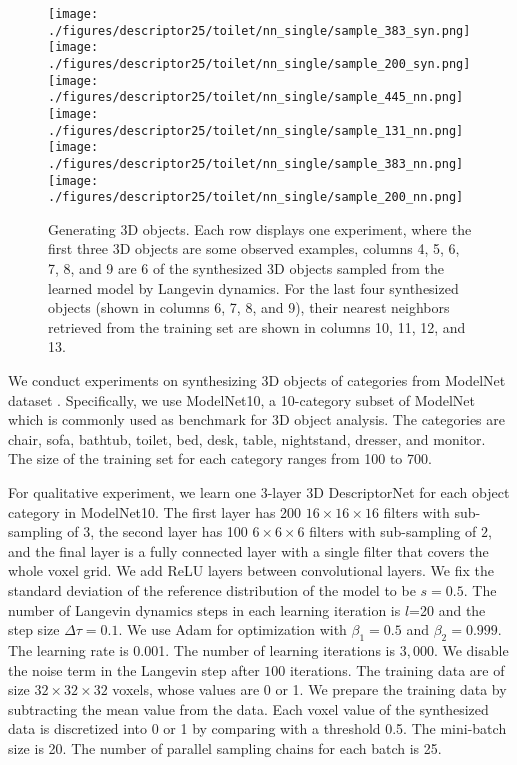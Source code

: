 \documentclass[10pt,twocolumn,letterpaper]{article}
\begin{document}
\begin{figure*}[h]
     \texttt{[image: ./figures/descriptor25/toilet/nn\_single/sample\_383\_syn.png]}          \hspace{-2.5mm}   
     \texttt{[image: ./figures/descriptor25/toilet/nn\_single/sample\_200\_syn.png]}        \hspace{-2.5mm}        
     \texttt{[image: ./figures/descriptor25/toilet/nn\_single/sample\_445\_nn.png]}          \hspace{-3mm}   
     \texttt{[image: ./figures/descriptor25/toilet/nn\_single/sample\_131\_nn.png]}          \hspace{-3mm}   
     \texttt{[image: ./figures/descriptor25/toilet/nn\_single/sample\_383\_nn.png]}          \hspace{-2.5mm}  
     \texttt{[image: ./figures/descriptor25/toilet/nn\_single/sample\_200\_nn.png]}          \\
	\caption{Generating 3D objects. Each row displays one experiment, where the first three 3D objects are some observed examples, columns 4, 5, 6, 7, 8, and 9 are 6 of the synthesized 3D objects sampled from the learned model by Langevin dynamics. For the last four synthesized objects (shown in columns 6, 7, 8, and 9), their nearest neighbors retrieved from the training set are shown in columns 10, 11, 12, and 13. }	
	\label{exp:synthesis}
\end{figure*}


We conduct experiments on synthesizing 3D objects of categories from ModelNet dataset \cite{wu20153d}. Specifically, we use ModelNet10, a 10-category subset of ModelNet which is commonly used as benchmark for 3D object analysis. The categories are chair, sofa, bathtub, toilet, bed, desk, table, nightstand, dresser, and monitor. The size of the training set for each category ranges from 100 to 700.

For qualitative experiment, we learn one 3-layer 3D DescriptorNet for each object category in ModelNet10. The first layer has 200 $16\times16\times16$ filters with sub-sampling of 3, the second layer has 100 $6\times6\times6$ filters with sub-sampling of $2$, and the final layer is a fully connected layer with a single filter that covers the whole voxel grid. We add ReLU layers between convolutional layers. We fix the standard deviation of the reference distribution of the model to be $s=0.5$. The number of Langevin dynamics steps in each learning iteration is $l$=20 and the step size $\Delta \tau =0.1$. We use Adam \cite{kingma2015adam} for optimization with $\beta_1=0.5$ and $\beta_2=0.999$. The learning rate is 0.001. The number of learning iterations is $3,000$. We disable the noise term in the Langevin step after $100$ iterations. The training data are of size $32 \times 32 \times 32$ voxels, whose values are 0 or 1. We prepare the training data by subtracting the mean value from the data. Each voxel value of the synthesized data is discretized into 0 or 1 by comparing with a threshold 0.5. The mini-batch size is 20. The number of parallel sampling chains for each batch is 25.
\end{document}
